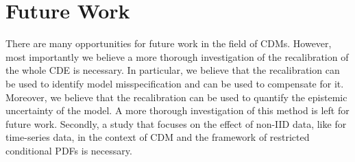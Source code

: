 \section{Future Work}
There are many opportunities for future work in the field of CDMs. However, most importantly we believe a more thorough investigation of the recalibration of the whole CDE is necessary. In particular, we believe that the recalibration can be used to identify model misspecification and can be used to compensate for it. Moreover, we believe that the recalibration can be used to quantify the epistemic uncertainty of the model. A more thorough investigation of this method is left for future work. Secondly, a study that focuses on the effect of non-IID data, like for time-series data, in the context of CDM and the framework of restricted conditional PDFs is necessary.